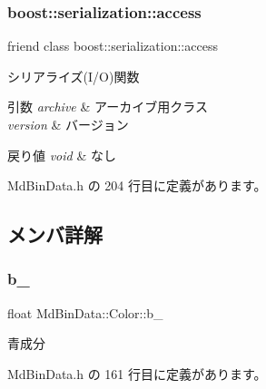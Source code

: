 \subsubsection{\texorpdfstring{boost\+::serialization\+::access}{boost::serialization::access}}
{\footnotesize\ttfamily friend class boost\+::serialization\+::access\hspace{0.3cm}{\ttfamily [friend]}}



シリアライズ(I/O)関数 


\begin{DoxyParams}{引数}
{\em archive} & アーカイブ用クラス \\
\hline
{\em version} & バージョン \\
\hline
\end{DoxyParams}

\begin{DoxyRetVals}{戻り値}
{\em void} & なし \\
\hline
\end{DoxyRetVals}


 Md\+Bin\+Data.\+h の 204 行目に定義があります。



\subsection{メンバ詳解}
\mbox{\label{class_md_bin_data_1_1_color_a082688900f611ea48822a5b4ccd74afc}} 
\subsubsection{\texorpdfstring{b\+\_\+}{b\_}}
{\footnotesize\ttfamily float Md\+Bin\+Data\+::\+Color\+::b\+\_\+\hspace{0.3cm}{\ttfamily [private]}}



青成分 



 Md\+Bin\+Data.\+h の 161 行目に定義があります。

\mbox{\label{class_md_bin_data_1_1_color_a5bdd552987125758d30cbe395909b118}} 
